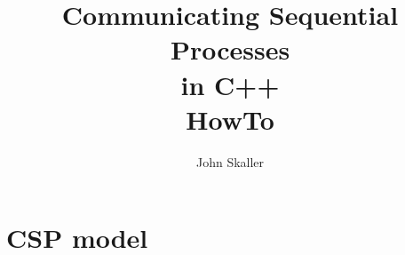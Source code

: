 \documentclass[oneside]{book}
\title{Communicating Sequential Processes\\ in C++\\ HowTo}
\author{John Skaller}
\begin{document}
\maketitle
\tableofcontents
\chapter{CSP model}
\end{document}
